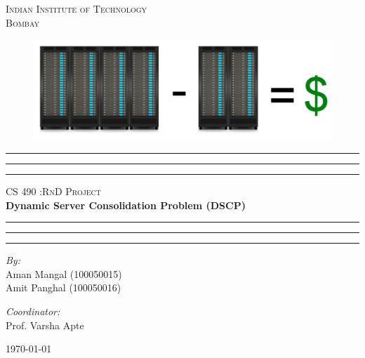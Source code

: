 \begin{titlepage}
\begin{center}
	\textsc{\LARGE Indian Institute of Technology
			\\Bombay} \\[2.5cm]
	\begin{figure}[ht!]
	\begin{center}
		\includegraphics[scale = 0.6]{images/1}
	\end{center}
	\end{figure}

    \vspace*{-0.6cm}
	\hrule \hrule \hrule
	\vspace{0.5cm}	
	\textsc{\Large CS 490 :RnD Project}\\[0.5cm]
	{\huge \bfseries Dynamic Server Consolidation Problem (DSCP)} \\[0.5cm]
	\hrule \hrule \hrule
	\vspace{4cm}
	
	\begin{minipage}{0.5\textwidth}
	\begin{flushleft} \large
		\emph{By:} \\
		Aman Mangal (100050015) \\
		Amit Panghal (100050016)
	\end{flushleft}
	\end{minipage}
	\begin{minipage}{0.4\textwidth}
	\begin{flushright} \large
		\emph{Coordinator:} \\
		Prof. Varsha Apte
	\end{flushright}
	\end{minipage}
	\vspace{1cm}
	
	{\large \today}
\end{center}
\end{titlepage}